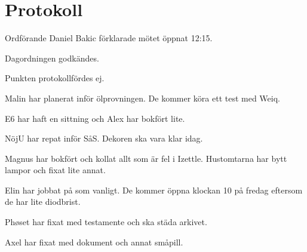 \documentclass[10pt]{article}
\def\mo{Daniel Bakic}
\begin{document}
\section*{Protokoll}
\begin{paragrafer}
	Ordförande {\mo} förklarade mötet öppnat 12:15.

	{\valavmo}

	{\valavms}

	{\valavj}

	{\tosg}

	{\ingaadj}


	Dagordningen godkändes.
	

	\ingaprot

	\begin{fyllnadsval} %
	\end{fyllnadsval}

	\begin{paragrafer}
		Punkten protokollfördes ej.


		Malin har planerat inför ölprovningen. De kommer köra ett test med Weiq.

		E6 har haft en sittning och Alex har bokfört lite.

		NöjU har repat inför SåS. Dekoren ska vara klar idag.

		Magnus har bokfört och kollat allt som är fel i Izettle. Hustomtarna har bytt lampor och fixat lite annat.

		Elin har jobbat på som vanligt. De kommer öppna klockan 10 på fredag eftersom de har lite diodbrist.

		Phøset har fixat med testamente och ska städa arkivet. 

		Axel har fixat med dokument och annat småpill.


\end{paragrafer}
\end{paragrafer}
\end{document}
